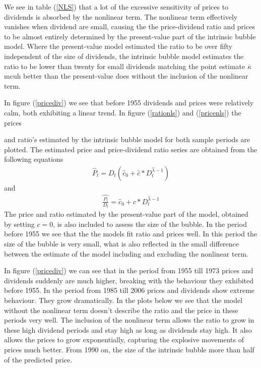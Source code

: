 \documentclass{article}
\begin{document}
 
We see in table (\ref{NLS}) that a lot of the excessive sensitivity of prices to dividends is absorbed by the nonlinear term. The nonlinear term effectively vanishes when dividend are small, causing the the price-dividend ratio and prices to be almost entirely determined by the present-value part of the intrinsic bubble model. Where the present-value model estimated the ratio to be over fifty independent of the size of dividends, the intrinsic bubble model estimates the ratio to be lower than twenty for small dividends matching the point estimate $\overline{\kappa}$ mcuh better than the present-value does without the inclusion of the nonlinear term. 

In figure (\ref{pricediv}) we see that before 1955 dividends and prices were relatively calm, both exhibiting a linear trend. In figure (\ref{rationls}) and (\ref{pricenls}) the prices

 and ratio's estimated by the intrinsic bubble model for both sample periods are plotted. The estimated price and price-dividend ratio series are obtained from the following equations 
\begin{eqnarray}
 \widehat{P}_t = D_t(\widehat{c}_0 + \widehat{c}*D_t^{\widehat{\lambda} - 1}) \label{priceestimate}
 \end{eqnarray}
 and 
\begin{eqnarray}
 \widehat{\frac{P_t}{D_t}}= \widehat{c}_0 + \widehat{c}*D_t^{\widehat{\lambda} - 1} \label{ratioestimate}
 \end{eqnarray} 
  The price and ratio estimated by the present-value part of the model, obtained by setting $c=0$, is also included to assess the size of the bubble\footnotemark.  In the period before 1955 we see that the the models fit ratio and prices well. In this period the size of the bubble is very small, what is also reflected in the small difference between the estimate of the model including and excluding the nonlinear term. 


In figure (\ref{pricediv}) we can see that in the period from 1955 till 1973 prices and dividends suddenly are much higher, breaking with the behaviour they exhibited before 1955. In the period from 1985 till 2006 prices and dividends show extreme behaviour. They grow dramatically. In the plots below we see that the model without the nonlinear term doesn't describe the ratio and the price in these periods very well. The inclusion of the nonlinear term allows the ratio to grow in these high dividend periods and stay high as long as dividends stay high. It also allows the prices to grow exponentially, capturing the explosive movements of prices much better. From 1990 on, the size of the intrinsic bubble more than half of the predicted price. 
\end{document}
